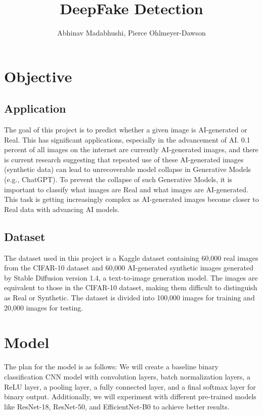 \documentclass{article}
\title{DeepFake Detection}
\author{Abhinav Madabhushi, Pierce Ohlmeyer-Dawson}
\date{}
\begin{document}
\maketitle

\section{Objective}
\subsection{Application}
The goal of this project is to predict whether a given image is AI-generated or Real. This has significant applications, especially in the advancement of AI. 0.1 percent of all images on the internet are currently AI-generated images, and there is current research suggesting that repeated use of these AI-generated images (synthetic data) can lead to unrecoverable model collapse in Generative Models (e.g., ChatGPT). To prevent the collapse of such Generative Models, it is important to classify what images are Real and what images are AI-generated. This task is getting increasingly complex as AI-generated images become closer to Real data with advancing AI models.

\subsection{Dataset}
The dataset used in this project is a Kaggle dataset containing 60,000 real images from the CIFAR-10 dataset and 60,000 AI-generated synthetic images generated by Stable Diffusion version 1.4, a text-to-image generation model. The images are equivalent to those in the CIFAR-10 dataset, making them difficult to distinguish as Real or Synthetic. The dataset is divided into 100,000 images for training and 20,000 images for testing.

\section{Model}
The plan for the model is as follows:
We will create a baseline binary classification CNN model with convolution layers, batch normalization layers, a ReLU layer, a pooling layer, a fully connected layer, and a final softmax layer for binary output. Additionally, we will experiment with different pre-trained models like ResNet-18, ResNet-50, and EfficientNet-B0 to achieve better results.
\end{document}

